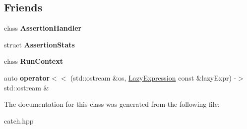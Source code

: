 \subsection*{Friends}
\begin{DoxyCompactItemize}
\item 
class {\bfseries Assertion\+Handler}\hypertarget{classCatch_1_1LazyExpression_a4301a3aa57b612dd8b6ef8461742ecab}{}\label{classCatch_1_1LazyExpression_a4301a3aa57b612dd8b6ef8461742ecab}

\item 
struct {\bfseries Assertion\+Stats}\hypertarget{classCatch_1_1LazyExpression_a64019eb137f5ce447cdc71cb80b6e7a4}{}\label{classCatch_1_1LazyExpression_a64019eb137f5ce447cdc71cb80b6e7a4}

\item 
class {\bfseries Run\+Context}\hypertarget{classCatch_1_1LazyExpression_af3aa096bb29a772bc534830f29a2ce7a}{}\label{classCatch_1_1LazyExpression_af3aa096bb29a772bc534830f29a2ce7a}

\item 
auto {\bfseries operator$<$$<$} (std\+::ostream \&os, \hyperlink{classCatch_1_1LazyExpression}{Lazy\+Expression} const \&lazy\+Expr) -\/$>$ std\+::ostream \&\hypertarget{classCatch_1_1LazyExpression_aa01086581cab2fcd2d4580b8fa787dfc}{}\label{classCatch_1_1LazyExpression_aa01086581cab2fcd2d4580b8fa787dfc}

\end{DoxyCompactItemize}


The documentation for this class was generated from the following file\+:\begin{DoxyCompactItemize}
\item 
catch.\+hpp\end{DoxyCompactItemize}
